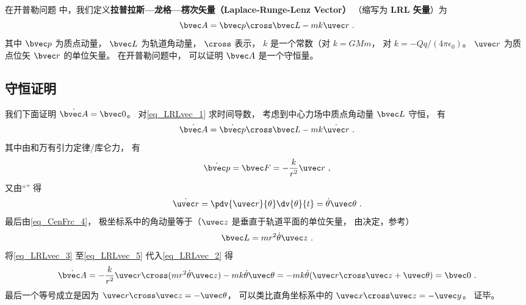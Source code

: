 

在开普勒问题%
中，我们定义\textbf{拉普拉斯—龙格—楞次矢量（Laplace-Runge-Lenz Vector）} （缩写为 \textbf{LRL 矢量}）为
\begin{equation}\label{eq_LRLvec_1}
\bvec A = \bvec p \cross \bvec L - mk \uvec r~.
\end{equation}
其中 $\bvec p$ 为质点动量， $\bvec L$ 为轨道角动量， $\cross$ 表示， $k$ 是一个常数（对 $k = GMm$， 对 $k = -Qq/(4\pi\epsilon_0)$。 $\uvec r$ 为质点位矢 $\bvec r$ 的单位矢量。 在开普勒问题中， 可以证明 $\bvec A$ 是一个守恒量。

\subsection{守恒证明}
我们下面证明 $\dot{\bvec A} = \bvec 0$。 对\autoref{eq_LRLvec_1} 求时间导数， 考虑到中心力场中质点角动量 $\bvec L$ 守恒， 有
\begin{equation}\label{eq_LRLvec_2}
\dot{\bvec A} = \dot{\bvec p}\cross \bvec L  - mk\dot{\uvec r}~.
\end{equation}
其中由和万有引力定律/库仑力， 有
\begin{equation}\label{eq_LRLvec_3}
\dot{\bvec p} = \bvec F = - \frac{k}{r^2}\uvec r~,
\end{equation}
又由“” 得
\begin{equation}\label{eq_LRLvec_4}
\dot{\uvec r} = \pdv{\uvec r}{\theta} \dv{\theta}{t} = \dot\theta\uvec \theta~.
\end{equation}
最后由\autoref{eq_CenFrc_4}， 极坐标系中的角动量等于（$\uvec z$ 是垂直于轨道平面的单位矢量， 由决定，参考）
\begin{equation}\label{eq_LRLvec_5}
\bvec L = mr^2\dot \theta \uvec z~.
\end{equation}
将\autoref{eq_LRLvec_3} 至\autoref{eq_LRLvec_5} 代入\autoref{eq_LRLvec_2} 得
\begin{equation}
\dot{\bvec A} = -\frac{k}{r^2}\uvec r \cross (mr^2\dot\theta\uvec z) - mk\dot\theta\uvec\theta
=-mk\dot\theta (\uvec r\cross \uvec z + \uvec \theta)
= \bvec 0~.
\end{equation}
最后一个等号成立是因为 $\uvec r\cross\uvec z = -\uvec\theta$， 可以类比直角坐标系中的 $\uvec x\cross\uvec z = -\uvec y$。 证毕。

